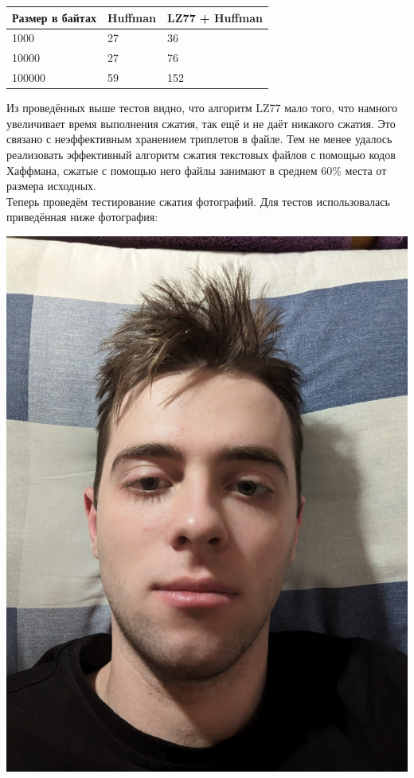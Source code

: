 \documentclass[12pt]{article}
\begin{document}
    \begin{tabular}{ | l | l | l | }
        \hline
            Размер в байтах & Huffman & LZ77 + Huffman \\ \hline
            1000            & 27      & 36             \\
            10000           & 27      & 76             \\
            100000          & 59      & 152            \\
        \hline
    \end{tabular}

    Из проведённых выше тестов видно, что алгоритм LZ77 мало того, что намного 
    увеличивает время выполнения сжатия, так ещё и не даёт никакого сжатия. 
    Это связано с неэффективным хранением триплетов в файле. Тем не менее 
    удалось реализовать эффективный алгоритм сжатия текстовых файлов с помощью 
    кодов Хаффмана, сжатые с помощью него файлы занимают в среднем 60\% места 
    от размера исходных. \\ Теперь проведём тестирование сжатия фотографий. Для 
    тестов использовалась приведённая ниже фотография:

    \begin{center}
        \includegraphics[scale=0.065]{photo.jpg}
    \end{center}
\end{document}
